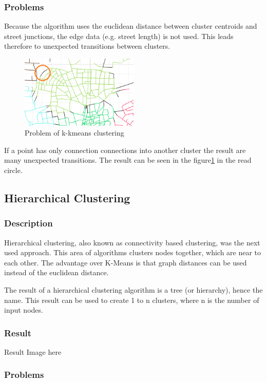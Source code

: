 \documentclass[11pt, a4paper]{report}
\begin{document}
\subsubsection{Problems}
Because the algorithm uses the euclidean distance between cluster centroids and street junctions, the edge data (e.g. street length) is not used. This leads therefore to unexpected transitions between clusters.
\begin{figure}[!h]
    \centering
    \includegraphics[width=0.5\textwidth]{clusteranalysis_kmeans_problem.png}
    \caption{Problem of k-kmeans clustering\label{fig:KmeansProblem}}
\end{figure}
\newline
If a point has only connection connections into another cluster the result are many unexpected transitions. The result can be seen in the figure\ref{fig:KmeansProblem} in the read circle. 

\pagebreak
\subsection{Hierarchical Clustering}
\subsubsection{Description}
Hierarchical clustering, also known as connectivity based clustering, was the next used approach. This area of algorithms clusters nodes together, which are near to each other. The advantage over K-Means is that graph distances can be used instead of the euclidean distance.

The result of a hierarchical clustering algorithm is a tree (or hierarchy), hence the name. This result can be used to create 1 to n clusters, where n is the number of input nodes.

\subsubsection{Result}
Result Image here

\subsubsection{Problems}
\end{document}
